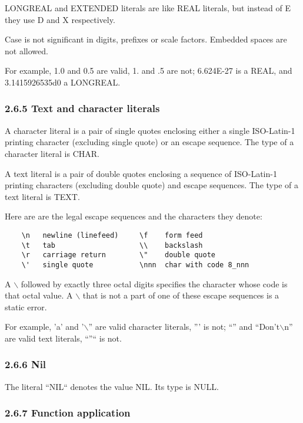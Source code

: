 \documentclass[10pt]{article}
\begin{document}
 LONGREAL and EXTENDED literals are like REAL literals, but instead of E they use D and X respectively. 


 Case is not significant in digits, prefixes or scale factors. Embedded spaces are not allowed. 


  For example, 1.0 and 0.5 are valid, 1. and .5 are not; 6.624E-27 is a REAL, and 3.1415926535d0 a LONGREAL. 


 
\subsubsection*{2.6.5 Text and character literals}


  A character literal is a pair of single quotes enclosing either a single ISO-Latin-1 printing character (excluding single quote) or an escape sequence. The type of a character literal is CHAR. 


 A text literal is a pair of double quotes enclosing a sequence of ISO-Latin-1 printing characters (excluding double quote) and escape sequences. The type of a text literal is TEXT. 


 Here are are the legal escape sequences and the characters they denote: 
\begin{verbatim}
    \n   newline (linefeed)     \f    form feed 
    \t   tab                    \\    backslash 
    \r   carriage return        \"    double quote 
    \'   single quote           \nnn  char with code 8_nnn
\end{verbatim}
 A $\backslash$ followed by exactly three octal digits specifies the character whose code is that octal value. A $\backslash$ that is not a part of one of these escape sequences is a static error. 


  For example, 'a' and '$\backslash$'' are valid character literals, ''' is not; ``'' and ``Don't$\backslash$n'' are valid text literals, ``''`` is not. 


 
\subsubsection*{2.6.6 Nil}


  The literal ``NIL`` denotes the value NIL. Its type is NULL. 


 
\subsubsection*{2.6.7 Function application}
\end{document}
